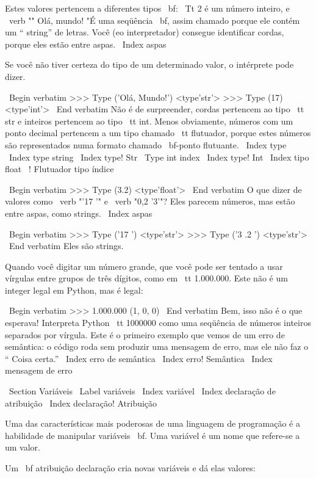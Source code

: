 \documentclass[10pt]{book}
\begin{document}
{Estes valores pertencem a diferentes tipos {\ bf}:
{\ Tt 2} é um número inteiro, e \ verb "" Olá, mundo! "É uma seqüência {\ bf},
assim chamado porque ele contém um `` string'' de letras.
Você (eo interpretador) consegue identificar
cordas, porque eles estão entre aspas.
\ Index {aspas}

Se você não tiver certeza do tipo de um determinado valor, o intérprete pode dizer.

\ Begin {verbatim}
>>> Type ('Olá, Mundo!')
<type'str'>
>>> Type (17)
<type'int'>
\ End {verbatim}
%
Não é de surpreender, cordas pertencem ao tipo {\ tt str} e
inteiros pertencem ao tipo {\ tt int}. Menos obviamente, números
com um ponto decimal pertencem a um tipo chamado {\ tt flutuador},
porque estes números são representados numa
formato chamado {\ bf-ponto flutuante}.
\ Index {type}
\ Index {type string}
\ Index {type! Str}
\ {Type} int index
\ Index {type! Int}
\ Index {tipo float}
\ {!} Flutuador tipo índice

\ Begin {verbatim}
>>> Type (3.2)
<type'float'>
\ End {verbatim}
%
O que dizer de valores como \ verb "'17 '" e \ verb "0,2 '3'"?
Eles parecem números, mas estão entre aspas, como
strings.
\ Index {aspas}

\ Begin {verbatim}
>>> Type ('17 ')
<type'str'>
>>> Type ('3 .2 ')
<type'str'>
\ End {verbatim}
%
Eles são strings.

Quando você digitar um número grande, que você pode ser tentado a usar vírgulas
entre grupos de três dígitos, como em {\ tt 1.000.000}. Este não é um
integer legal em Python, mas é legal:

\ Begin {verbatim}
>>> 1.000.000
(1, 0, 0)
\ End {verbatim}
%
Bem, isso não é o que esperava! Interpreta Python {\ tt
  1000000} como uma seqüência de números inteiros separados por vírgula.
Este é o primeiro exemplo que vemos de um erro de semântica: o código
roda sem produzir uma mensagem de erro, mas ele não faz o
`` Coisa certa.''
\ Index {erro de semântica}
\ Index {erro! Semântica}
\ Index {mensagem de erro}



\ Section {Variáveis}
\ Label {variáveis}
\ Index {variável}
\ Index {declaração de atribuição}
\ Index {declaração! Atribuição}

Uma das características mais poderosas de uma linguagem de programação é a
habilidade de manipular variáveis ​​{\ bf}. Uma variável é um nome que
refere-se a um valor.

Um {\ bf atribuição declaração} cria novas variáveis ​​e dá
elas valores:

}
\end{document}
